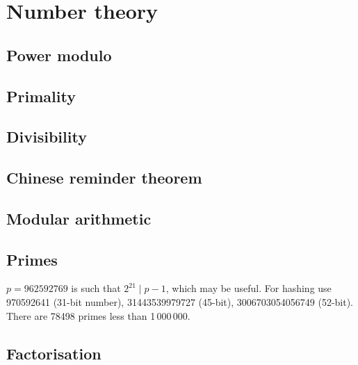 
\chapter{Number theory}

	\section{Power modulo}

	\section{Primality}

	\section{Divisibility}

	\section{Chinese reminder theorem}

	\section{Modular arithmetic}

	\section{Primes}
		$p=962592769$ is such that $2^{21} \mid p-1$, which may be useful. For hashing
		use 970592641 (31-bit number), 31443539979727 (45-bit), 3006703054056749
		(52-bit). There are 78498 primes less than 1\,000\,000.

	\section{Factorisation}
